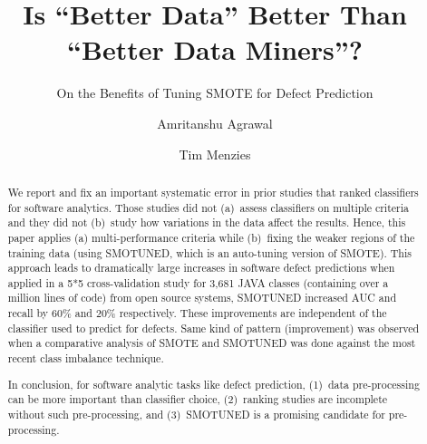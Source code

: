 \documentclass[sigconf]{acmart}
\theoremstyle{break}
\newcommand{\sma}{{\sc SMOTE}}
\newcommand{\smb}{{\sc SMOTUNED}}
\begin{document}

\title{Is ``Better Data'' Better Than ``Better Data Miners''?}
\subtitle{On the Benefits of Tuning SMOTE for Defect Prediction }



\author{Amritanshu Agrawal}

\author{Tim Menzies}

\begin{abstract}
We report and fix an important systematic error in prior
studies that ranked classifiers for software analytics.
Those studies  did  not (a)~assess classifiers on multiple   criteria
and they did not 
(b)~study  how variations in the  data affect the results. 
Hence, 
this paper applies (a)  multi-performance criteria while (b)~fixing the weaker regions of the training
 data (using {\smb}, which is an auto-tuning version of {\sma}).
This approach
leads to dramatically large increases in software defect predictions when applied in a 5*5 cross-validation study for  3,681	JAVA classes (containing over a million lines of code) from open source  systems,
{\smb} increased
AUC and recall by 60\% and 20\% respectively. 
These improvements are independent of the classifier used to
predict for defects. Same kind of pattern (improvement) was observed when a comparative analysis of {\sma} and {\smb} was done against the most recent class imbalance technique.

In conclusion, for software analytic tasks like defect prediction, (1)~data
pre-processing can be more important than  classifier
choice,
(2)~ranking studies  are  incomplete  without
 such pre-processing, and
(3)~{\smb} is a   promising candidate for  pre-processing.

\end{abstract}
\end{document}
